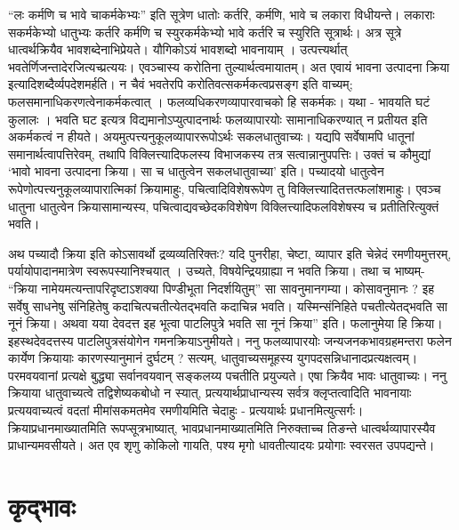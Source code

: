 “लः कर्मणि च भावे चाकर्मकेभ्यः” इति सूत्रेण धातोः कर्तरि, कर्मणि, भावे च लकारा विधीयन्ते। लकाराः सकर्मकेभ्यो धातुभ्यः कर्तरि कर्मणि च स्युरकर्मकेभ्यो भावे कर्तरि च स्युरिति सूत्रार्थः। अत्र सूत्रे धात्वर्थक्रियैव भावशब्देनाभिप्रेयते। यौगिकोऽयं भावशब्दो भावनायाम् । उत्पत्त्यर्थात् भवतेर्णिजन्तादेरजित्यच्प्रत्ययः। एवञ्चास्य करोतिना तुल्यार्थत्वमायातम्। अत एवायं भावना उत्पादना क्रिया इत्यादिशब्दैर्व्यपदेशमर्हति। न चैवं भवतेरपि करोतिवत्सकर्मकत्वप्रसङ्ग इति वाच्यम्; फलसमानाधिकरणत्वेनाकर्मकत्वात् । फलव्यधिकरणव्यापारवाचको हि सकर्मकः। यथा - भावयति घटं कुलालः । भवति घट इत्यत्र विद्यमानोऽप्युत्पादनार्थः फलव्यापारयोः सामानाधिकरण्यात् न प्रतीयत इति अकर्मकत्वं न हीयते। अयमुत्पत्त्यनुकूलव्यापाररूपोऽर्थः सकलधातुवाच्यः। यद्यपि सर्वेषामपि धातूनां समानार्थत्वापत्तिरेवम्, तथापि विक्लित्त्यादिफलस्य विभाजकस्य तत्र सत्वान्नानुपपत्तिः। उक्तं च कौमुद्यां ‘भावो भावना उत्पादना क्रिया। सा च धातुत्वेन सकलधातुवाच्या’ इति। पच्यादयो धातुत्वेन रूपेणोत्पत्त्यनुकूलव्यापारात्मिकां क्रियामाहुः, पचित्वादिविशेषरूपेण तु विक्लित्त्यादितत्तत्फलांशमाहुः। एवञ्च धातुना धातुत्वेन क्रियासामान्यस्य, पचित्वाद्यवच्छेदकविशेषेण विक्लित्त्यादिफलविशेषस्य च प्रतीतिरित्युक्तं भवति।

अथ पच्यादौ क्रिया इति कोऽसावर्थो द्रव्यव्यतिरिक्तः? यदि पुनरीहा, चेष्टा, व्यापार इति चेन्नेदं रमणीयमुत्तरम्, पर्यायोपादानमात्रेण स्वरूपस्यानिश्चयात् । उच्यते, विषयेन्द्रियग्राह्या न भवति क्रिया। तथा च भाष्यम्-  “क्रिया नामेयमत्यन्तापरिदृष्टाऽशक्या पिण्डीभूता निदर्शयितुम्” सा सावनुमानगम्या। कोसावनुमानः ? इह सर्वेषु साधनेषु संनिहितेषु कदाचित्पचतीत्येतद्भवति कदाचिन्न भवति। यस्मिन्संनिहिते पचतीत्येतद्भवति सा नूनं क्रिया। अथवा यया देवदत्त इह भूत्वा पाटलिपुत्रे भवति सा नूनं क्रिया” इति। फलानुमेया हि क्रिया। इहस्थदेवदत्तस्य पाटलिपुत्रसंयोगेन गमनक्रियाऽनुमीयते। ननु फलव्यापारयोः जन्यजनकभावग्रहमन्तरा फलेन कार्येण क्रियायाः कारणस्यानुमानं दुर्घटम् ? सत्यम्, धातुवाच्यसमूहस्य युगपदसन्निधानादप्रत्यक्षत्वम्।परमवयवानां प्रत्यक्षे बुद्ध्या सर्वानवयवान् सङ्कलय्य पचतीति प्रयुज्यते। एषा क्रियैव भावः धातुवाच्यः। ननु क्रियाया धातुवाच्यत्वे तद्विशेष्यकबोधो न स्यात्, प्रत्ययार्थप्राधान्यस्य सर्वत्र क्लृप्तत्वादिति भावनायाः प्रत्ययवाच्यत्वं वदतां मीमांसकमतमेव रमणीयमिति चेदाहुः - प्रत्ययार्थः प्रधानमित्युत्सर्गः। क्रियाप्रधानमाख्यातमिति रूपप्सूत्रभाष्यात्, भावप्रधानमाख्यातमिति निरुक्ताच्च तिङन्ते धात्वर्थव्यापारस्यैव प्राधान्यमवसीयते। अत एव शृणु कोकिलो गायति, पश्य मृगो धावतीत्यादयः प्रयोगाः स्वरसत उपपद्यन्ते।

\section*{कृद्भावः} 

